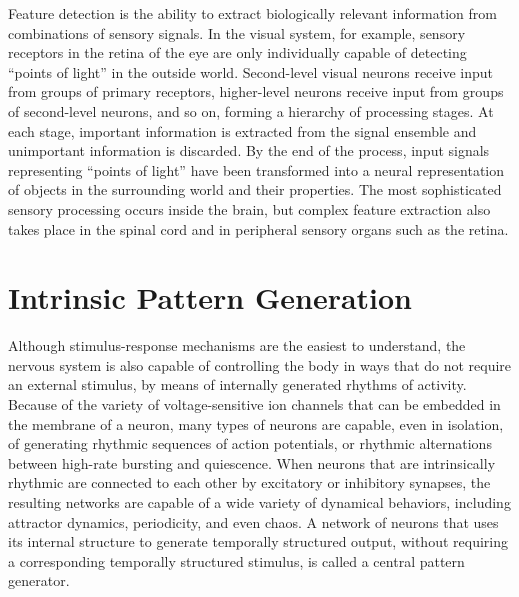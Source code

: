 \documentclass[]{book}
\begin{document}
Feature detection is the ability to extract biologically relevant information from combinations of sensory signals. In the visual system, for example, sensory receptors in the retina of the eye are only individually capable of detecting ``points of light'' in the outside world. Second-level visual neurons receive input from groups of primary receptors, higher-level neurons receive input from groups of second-level neurons, and so on, forming a hierarchy of processing stages. At each stage, important information is extracted from the signal ensemble and unimportant information is discarded. By the end of the process, input signals representing ``points of light'' have been transformed into a neural representation of objects in the surrounding world and their properties. The most sophisticated sensory processing occurs inside the brain, but complex feature extraction also takes place in the spinal cord and in peripheral sensory organs such as the retina.

\hypertarget{intrinsic-pattern-generation}{%
\section{Intrinsic Pattern Generation}\label{intrinsic-pattern-generation}}

Although stimulus-response mechanisms are the easiest to understand, the nervous system is also capable of controlling the body in ways that do not require an external stimulus, by means of internally generated rhythms of activity. Because of the variety of voltage-sensitive ion channels that can be embedded in the membrane of a neuron, many types of neurons are capable, even in isolation, of generating rhythmic sequences of action potentials, or rhythmic alternations between high-rate bursting and quiescence. When neurons that are intrinsically rhythmic are connected to each other by excitatory or inhibitory synapses, the resulting networks are capable of a wide variety of dynamical behaviors, including attractor dynamics, periodicity, and even chaos. A network of neurons that uses its internal structure to generate temporally structured output, without requiring a corresponding temporally structured stimulus, is called a central pattern generator.
\end{document}
